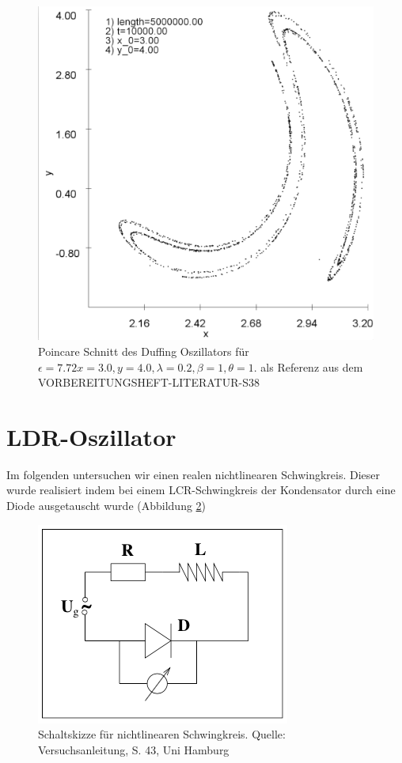 \documentclass{scrartcl}
\begin{document}
\begin{figure}
	\centering
	\includegraphics[scale=0.20]{poincare-772}
	\caption{Poincare Schnitt des Duffing Oszillators für $\epsilon=7.72 x=3.0, y=4.0, \lambda=0.2, \beta=1, \theta=1$. als Referenz aus dem VORBEREITUNGSHEFT-LITERATUR-S38}
	\label{img:poincare-772}
\end{figure}


\section {LDR-Oszillator}
Im folgenden untersuchen wir einen realen nichtlinearen Schwingkreis. Dieser wurde realisiert indem bei einem LCR-Schwingkreis der Kondensator durch eine Diode ausgetauscht wurde (Abbildung \ref{img:schaltskizze})
\begin{figure}
	\centering
	\includegraphics[scale=0.60]{schaltskizze}
	\caption{Schaltskizze für nichtlinearen Schwingkreis. Quelle: Versuchsanleitung, S. 43, Uni Hamburg}
	\label{img:schaltskizze}
\end{figure}
\end{document}
